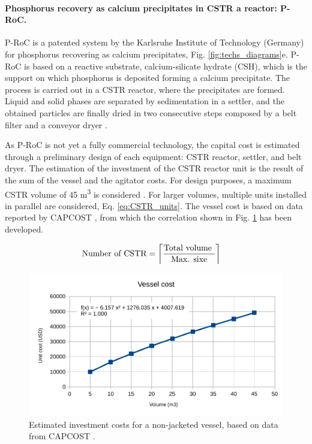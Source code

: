 \begin{refsection}[referencesCh4]
\paragraph{Phosphorus recovery as calcium precipitates in CSTR a reactor: P-RoC.}
P-RoC is a patented system by the Karlsruhe Institute of Technology (Germany) for phosphorus recovering as calcium precipitates, Fig. \ref{fig:techs_diagrams}e. P-RoC is based on a reactive substrate, calcium-silicate hydrate (CSH), which is the support on which phosphorus is deposited forming a calcium precipitate. The process is carried out in a CSTR reactor, where the precipitates are formed. Liquid and solid phases are separated by sedimentation in a settler, and the obtained particles are finally dried in two consecutive steps composed by a belt filter and a conveyor dryer \citep{ehbrecht_p-recovery_2011}.

As P-RoC is not yet a fully commercial technology, the capital cost is estimated through a preliminary design of each equipment: CSTR reactor, settler, and belt dryer. The estimation of the investment of the CSTR reactor unit is the result of the sum of the vessel and the agitator costs. For design purposes, a maximum CSTR volume of 45 m\textsuperscript{3} is considered \citep{CAPCOST}. For larger volumes, multiple units installed in parallel are considered, Eq. \ref{eq:CSTR_units}. The vessel cost is based on data reported by CAPCOST \citep{CAPCOST}, from which the correlation shown in Fig. \ref{fig:vessel_investment_cost} has been developed.

\begin{align} \label{eq:CSTR_units}
& \text{Number of CSTR} = \ceil[\bigg]{\frac{\text{Total volume }}{\text{Max. sixe}}}
\end{align}

\begin{figure}[h]
	\centering
	\includegraphics[width=0.6\linewidth]{gfx/AppendixC/vessel_investment_cost} 
	\caption{Estimated investment costs for a non-jacketed vessel, based on data from CAPCOST \protect\citep{CAPCOST}.}
	\label{fig:vessel_investment_cost}
\end{figure}


\end{refsection}
